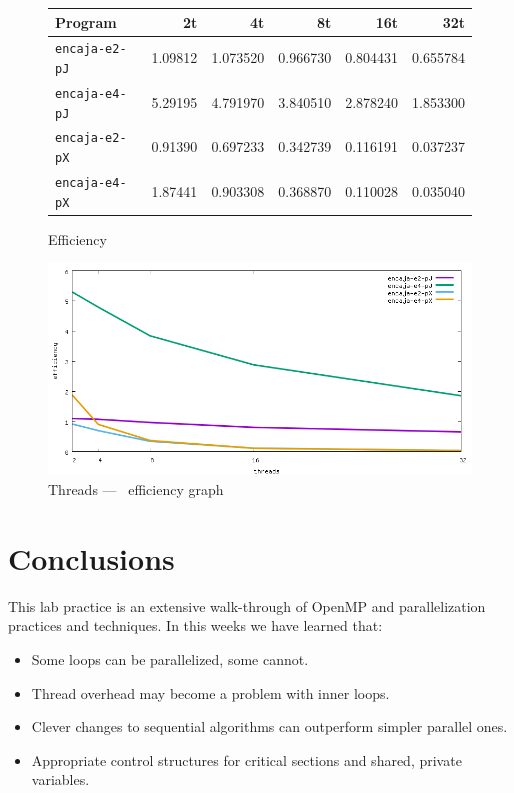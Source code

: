 \documentclass[a4paper]{article}
\begin{document}
\begin{figure}[h]
	\centering
	\begin{tabular}{l r r r r r}
		Program 			  & 2t  	& 4t 	   & 8t 	  & 16t      & 32t 		\\ \hline
		\texttt{encaja-e2-pJ} & 1.09812 & 1.073520 & 0.966730 & 0.804431 & 0.655784	\\
		\texttt{encaja-e4-pJ} & 5.29195 & 4.791970 & 3.840510 & 2.878240 & 1.853300	\\
		\texttt{encaja-e2-pX} & 0.91390 & 0.697233 & 0.342739 & 0.116191 & 0.037237 \\
		\texttt{encaja-e4-pX} & 1.87441 & 0.903308 & 0.368870 & 0.110028 & 0.035040 \\ \hline
	\end{tabular}
	\caption{Efficiency}
	\label{fig:table-efficiency}
\end{figure}
\begin{figure}[h]
    \centering
    \includegraphics[width=\textwidth]{../img/efficiency}
    \caption{Threads --- \unskip \, efficiency graph}
    \label{fig:graph-efficiency}
\end{figure}

\section{Conclusions}
This lab practice is an extensive walk-through of OpenMP and parallelization practices and techniques. In this weeks we have learned that:
\begin{itemize}
    \item Some loops can be parallelized, some cannot.
    \item Thread overhead may become a problem with inner loops.
    \item Clever changes to sequential algorithms can outperform simpler parallel ones.
    \item Appropriate control structures for critical sections and shared, private variables.
\end{itemize}
\end{document}
